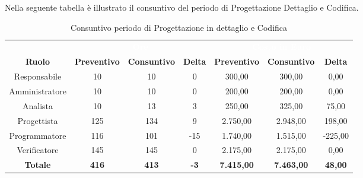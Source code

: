 Nella seguente tabella è illustrato il consuntivo del periodo di Progettazione Dettaglio e Codifica.
\begin{table}[H]
\centering
\begin{tabular}{c|ccc|ccc}
\rowcolor{greySWEight}
\multicolumn{1}{c}{} & \multicolumn{3}{c}{\textcolor{white}{\textbf{Ore}}} & \multicolumn{3}{c}{\textcolor{white}{\textbf{Costo in Euro}}} \\
{\textbf{Ruolo}} & {\textbf{Preventivo}} & {\textbf{Consuntivo}} & {\textbf{Delta}} & {\textbf{Preventivo}} & {\textbf{Consuntivo}} & {\textbf{Delta}} \\
Responsabile & 10 & 10 & 0 & 300,00 & 300,00 & 0,00 \\
Amministratore & 10 & 10 & 0 & 200,00 & 200,00 & 0,00 \\
Analista & 10 & 13 & 3 & 250,00 & 325,00 & 75,00 \\
Progettista & 125 & 134 & 9 & 2.750,00 & 2.948,00 & 198,00 \\
Programmatore & 116 & 101 & -15 & 1.740,00 & 1.515,00 & -225,00 \\
Verificatore & 145 & 145 & 0 & 2.175,00 & 2.175,00 & 0,00 \\
\hline
\textbf{Totale} & \textbf{416} & \textbf{413} &\textbf{ -3} & \textbf{7.415,00} & \textbf{7.463,00} & \textbf{48,00} \\

\end{tabular}
\caption{Consuntivo periodo di Progettazione in dettaglio e Codifica}
\end{table}

